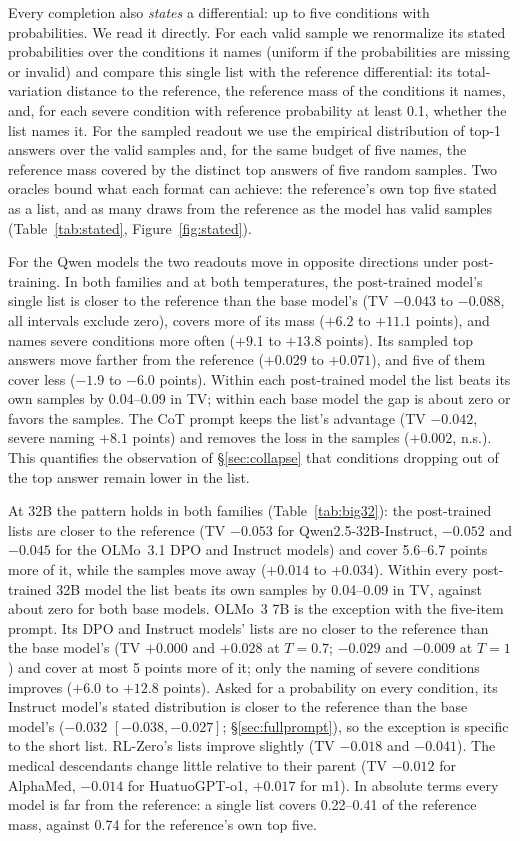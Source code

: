 \documentclass[11pt]{article}
\begin{document}
Every completion also \emph{states} a differential: up to five conditions with probabilities. We read it directly.
For each valid sample we renormalize its stated probabilities over the conditions it names (uniform if the probabilities are missing or invalid) and compare this single list with the reference differential: its total-variation distance to the reference, the reference mass of the conditions it names, and, for each severe condition with reference probability at least 0.1, whether the list names it.
For the sampled readout we use the empirical distribution of top-1 answers over the valid samples and, for the same budget of five names, the reference mass covered by the distinct top answers of five random samples.
Two oracles bound what each format can achieve: the reference's own top five stated as a list, and as many draws from the reference as the model has valid samples (Table~\ref{tab:stated}, Figure~\ref{fig:stated}).

For the Qwen models the two readouts move in opposite directions under post-training.
In both families and at both temperatures, the post-trained model's single list is closer to the reference than the base model's (TV $-0.043$ to $-0.088$, all intervals exclude zero), covers more of its mass ($+6.2$ to $+11.1$ points), and names severe conditions more often ($+9.1$ to $+13.8$ points).
Its sampled top answers move farther from the reference ($+0.029$ to $+0.071$), and five of them cover less ($-1.9$ to $-6.0$ points).
Within each post-trained model the list beats its own samples by 0.04--0.09 in TV; within each base model the gap is about zero or favors the samples.
The CoT prompt keeps the list's advantage (TV $-0.042$, severe naming $+8.1$ points) and removes the loss in the samples ($+0.002$, n.s.).
This quantifies the observation of \S\ref{sec:collapse} that conditions dropping out of the top answer remain lower in the list.

At 32B the pattern holds in both families (Table~\ref{tab:big32}): the post-trained lists are closer to the reference (TV $-0.053$ for Qwen2.5-32B-Instruct, $-0.052$ and $-0.045$ for the OLMo~3.1 DPO and Instruct models) and cover 5.6--6.7 points more of it, while the samples move away ($+0.014$ to $+0.034$). Within every post-trained 32B model the list beats its own samples by 0.04--0.09 in TV, against about zero for both base models.
OLMo~3 7B is the exception with the five-item prompt. Its DPO and Instruct models' lists are no closer to the reference than the base model's (TV $+0.000$ and $+0.028$ at $T{=}0.7$; $-0.029$ and $-0.009$ at $T{=}1$) and cover at most 5 points more of it; only the naming of severe conditions improves ($+6.0$ to $+12.8$ points). Asked for a probability on every condition, its Instruct model's stated distribution is closer to the reference than the base model's ($-0.032$ $[-0.038,-0.027]$; \S\ref{sec:fullprompt}), so the exception is specific to the short list. RL-Zero's lists improve slightly (TV $-0.018$ and $-0.041$).
The medical descendants change little relative to their parent (TV $-0.012$ for AlphaMed, $-0.014$ for HuatuoGPT-o1, $+0.017$ for m1).
In absolute terms every model is far from the reference: a single list covers 0.22--0.41 of the reference mass, against 0.74 for the reference's own top five.
\end{document}
